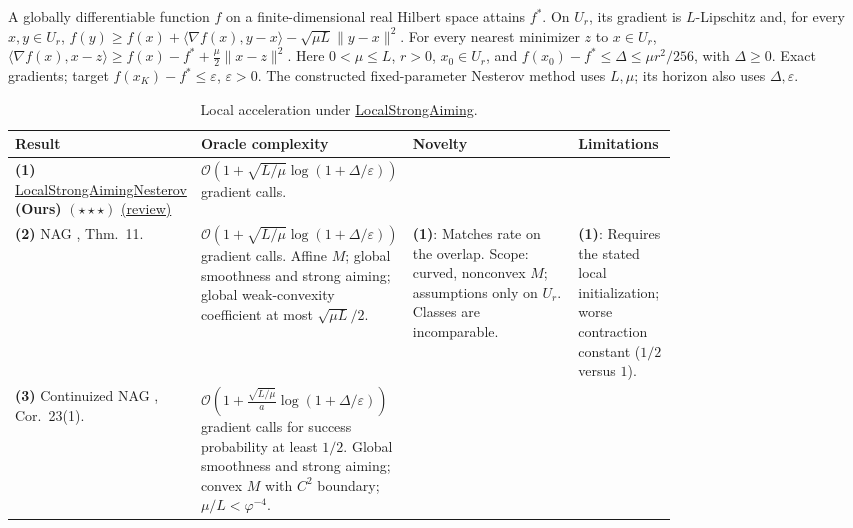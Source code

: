 \begin{table}[tp]
\centering
\caption{Local acceleration under \href{https://github.com/k3nfalt/longtails/blob/main/LongTails/Setups/LocalStrongAiming.lean}{LocalStrongAiming}.}\label{tab:LocalStrongAiming}
\parbox{\linewidth}{\footnotesize A globally differentiable function $f$ on a finite-dimensional real Hilbert space attains $f^*$. On $U_r$, its gradient is $L$-Lipschitz and, for every $x,y\in U_r$,
$f(y)\ge f(x)+\langle\nabla f(x),y-x\rangle-\sqrt{\mu L}\|y-x\|^2$.
For every nearest minimizer $z$ to $x\in U_r$,
$\langle\nabla f(x),x-z\rangle\ge f(x)-f^*+\frac{\mu}{2}\|x-z\|^2$.
Here $0<\mu\le L$, $r>0$, $x_0\in U_r$, and $f(x_0)-f^*\le\Delta\le\mu r^2/256$, with $\Delta\ge0$.
Exact gradients; target $f(x_K)-f^*\le\varepsilon$, $\varepsilon>0$.
The constructed fixed-parameter Nesterov method uses $L,\mu$; its horizon also uses $\Delta,\varepsilon$.}\par\smallskip
\begin{threeparttable}
\footnotesize
\setlength{\tabcolsep}{4pt}\renewcommand{\arraystretch}{1.25}
\begin{tabularx}{\linewidth}{@{}>{\raggedright\arraybackslash}p{0.20\linewidth}>{\raggedright\arraybackslash}p{0.32\linewidth}>{\raggedright\arraybackslash}p{0.25\linewidth}>{\raggedright\arraybackslash}X@{}}
\toprule
\textbf{Result} & \textbf{Oracle complexity} & \textbf{Novelty} & \textbf{Limitations} \\
\midrule
\textbf{(1)} \href{https://github.com/k3nfalt/longtails/blob/main/LongTails/Theorems/LocalStrongAimingNesterov.lean}{Local\allowbreak Strong\allowbreak Aiming\allowbreak Nesterov} \textbf{(Ours)} $(\star\star\star)$ \href{https://github.com/k3nfalt/longtails/blob/main/scripts/reviews/LocalStrongAimingNesterov.md}{(review)}
& $\mathcal{O}\!\left(1+\sqrt{L/\mu}\log(1+\Delta/\varepsilon)\right)$ gradient calls. & & \\
\midrule[1.2pt]
\textbf{(2)} NAG \citep{gssgGupta2025v3}, Thm.~11.
& $\mathcal{O}\!\left(1+\sqrt{L/\mu}\log(1+\Delta/\varepsilon)\right)$ gradient calls. Affine $M$; global smoothness and strong aiming; global weak-convexity coefficient at most $\sqrt{\mu L}/2$.
& \textbf{(1)}: Matches rate on the overlap. Scope: curved, nonconvex $M$; assumptions only on $U_r$. Classes are incomparable.
& \textbf{(1)}: Requires the stated local initialization; worse contraction constant ($1/2$ versus $1$). \\
\midrule
\textbf{(3)} Continuized NAG \citep{lsaHermant2026v2}, Cor.~23(1).
& $\mathcal{O}\!\left(1+\frac{\sqrt{L/\mu}}{a}\log(1+\Delta/\varepsilon)\right)$ gradient calls for success probability at least $1/2$. Global smoothness and strong aiming; convex $M$ with $C^2$ boundary; $\mu/L<\varphi^{-4}$.

\end{tabularx}
\end{threeparttable}
\end{table}
